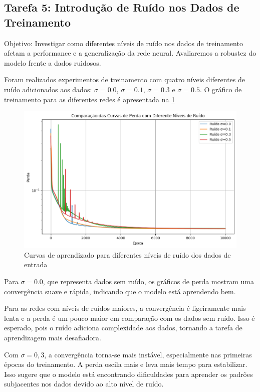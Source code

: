 \subsection{Tarefa 5: Introdução de Ruído nos Dados de Treinamento}

\begin{comandoquestao}
Objetivo: Investigar como diferentes níveis de ruído nos dados de treinamento 
afetam a performance e a generalização da rede neural. Avaliaremos a robustez 
do modelo frente a dados ruidosos.
\end{comandoquestao}

Foram realizados experimentos de treinamento com quatro níveis diferentes de 
ruído adicionados aos dados: $\sigma=0.0$, $\sigma=0.1$, $\sigma=0.3$ e 
$\sigma=0.5$. O gráfico de treinamento para as diferentes redes é apresentada 
na \cref{fig:tarefas05:curvas}


\begin{figure}[tbh]
	\centering
	\caption{Curvas de aprendizado para diferentes níveis de ruído dos dados de 
	entrada}
	\label{fig:tarefas05:curvas}
	\includegraphics[width=0.7\linewidth]{./0803_imgs/0365_tarefa05/png-241110-193148800-7110775020035268662.png}
\end{figure}


Para $\sigma=\num{0,0}$, que 
representa dados sem ruído, os gráficos de perda 
mostram uma convergência suave e rápida, indicando que o modelo está aprendendo 
bem.

Para as redes com níveis de ruídos maiores, a convergência é ligeiramente mais 
lenta e a perda é um pouco maior em comparação com os dados sem ruído. Isso é 
esperado, pois o ruído adiciona complexidade aos dados, tornando a tarefa de 
aprendizagem mais desafiadora.

Com $\sigma=0,3$, a convergência torna-se mais instável, especialmente nas 
primeiras 
épocas do treinamento. A perda oscila mais e leva mais tempo para estabilizar. 
Isso sugere que o modelo está encontrando dificuldades para aprender os padrões 
subjacentes nos 
dados devido ao alto nível de ruído.

